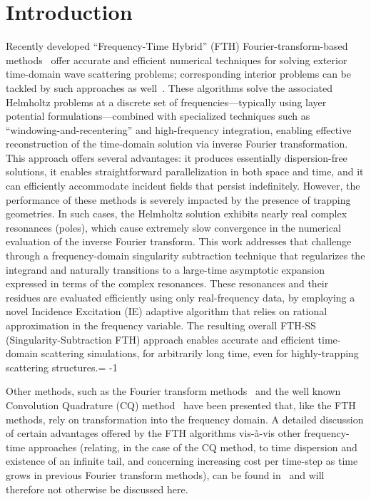 \documentclass[11pt]{article}
\theoremstyle{plain}
\theoremstyle{remark}
\begin{document}
\section{Introduction\label{intro}}
Recently developed ``Frequency-Time Hybrid'' (FTH)
Fourier-transform-based methods~\cite{abl,ablII} offer accurate and
efficient numerical techniques for solving exterior time-domain wave
scattering problems; corresponding interior problems can be tackled by
such approaches as well~\cite{bruno2024multiple,pan2025multi}.  These
algorithms solve the associated Helmholtz problems at a discrete set
of frequencies---typically using layer potential
formulations---combined with specialized techniques such as
``windowing-and-recentering'' and high-frequency integration, enabling
effective reconstruction of the time-domain solution via inverse
Fourier transformation.  This approach offers several advantages: it
produces essentially dispersion-free solutions, it enables
straightforward parallelization in both space and time, and it can
efficiently accommodate incident fields that persist
indefinitely. However, the performance of these methods is severely
impacted by the presence of trapping geometries. In such cases, the
Helmholtz solution exhibits nearly real complex resonances (poles),
which cause extremely slow convergence in the numerical evaluation of
the inverse Fourier transform. This work addresses that challenge
through a frequency-domain singularity subtraction technique that
regularizes the integrand and naturally transitions to a large-time
asymptotic expansion expressed in terms of the complex
resonances. These resonances and their residues are evaluated
efficiently using only real-frequency data, by employing a novel
Incidence Excitation (IE) adaptive algorithm that relies on rational
approximation in the frequency variable. The resulting overall FTH-SS
(Singularity-Subtraction FTH) approach enables accurate and efficient
time-domain scattering simulations, for arbitrarily long time, even
for highly-trapping scattering structures.\looseness = -1

Other methods, such as the Fourier transform
methods~\cite{douglas1993frequency,mecocci2000new} and the well known
Convolution Quadrature (CQ)
method~\cite{lubich1994multistep,banjai2010multistep,betcke2017overresolving}
have been presented that, like the FTH methods, rely on transformation
into the frequency domain.  A detailed discussion of certain
advantages offered by the FTH algorithms vis-\`a-vis other
frequency-time approaches (relating, in the case of the CQ method, to
time dispersion and existence of an infinite tail, and concerning
increasing cost per time-step as time grows in previous Fourier
transform methods), can be found in~\cite{abl} and will therefore not
otherwise be discussed here.
\end{document}
